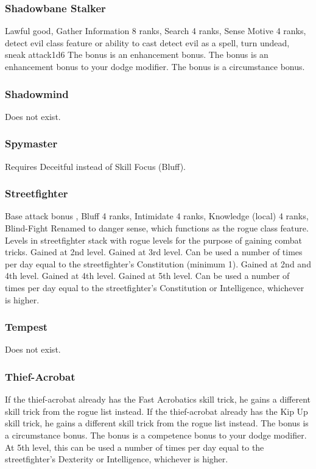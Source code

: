 \subsubsection{Shadowbane Stalker}
 Lawful good, Gather Information 8 ranks, Search 4 ranks, Sense Motive 4 ranks, detect evil class feature or ability to cast detect evil as a spell, turn undead, sneak attack\plus1d6
 The bonus is an enhancement bonus.
 The bonus is an enhancement bonus to your dodge modifier.
 The bonus is a circumstance bonus.
\subsubsection{Shadowmind}
Does not exist.
\subsubsection{Spymaster}
 Requires Deceitful instead of Skill Focus (Bluff).
\subsubsection{Streetfighter}
 Base attack bonus , Bluff 4 ranks, Intimidate 4 ranks, Knowledge (local) 4 ranks, Blind-Fight
 Renamed to danger sense, which functions as the rogue class feature.
 Levels in streetfighter stack with rogue levels for the purpose of gaining combat tricks.
 Gained at 2nd level.
 Gained at 3rd level. Can be used a number of times per day equal to the streetfighter's Constitution (minimum 1).
 Gained at 2nd and 4th level.
 Gained at 4th level.
 Gained at 5th level. Can be used a number of times per day equal to the streetfighter's Constitution or Intelligence, whichever is higher.
\subsubsection{Tempest}
Does not exist.
\subsubsection{Thief-Acrobat}
 If the thief-acrobat already has the Fast Acrobatics skill trick, he gains a different skill trick from the rogue list instead.
 If the thief-acrobat already has the Kip Up skill trick, he gains a different skill trick from the rogue list instead.
 The bonus is a circumstance bonus.
 The bonus is a competence bonus to your dodge modifier.
 At 5th level, this can be used a number of times per day equal to the streetfighter's Dexterity or Intelligence, whichever is higher.
